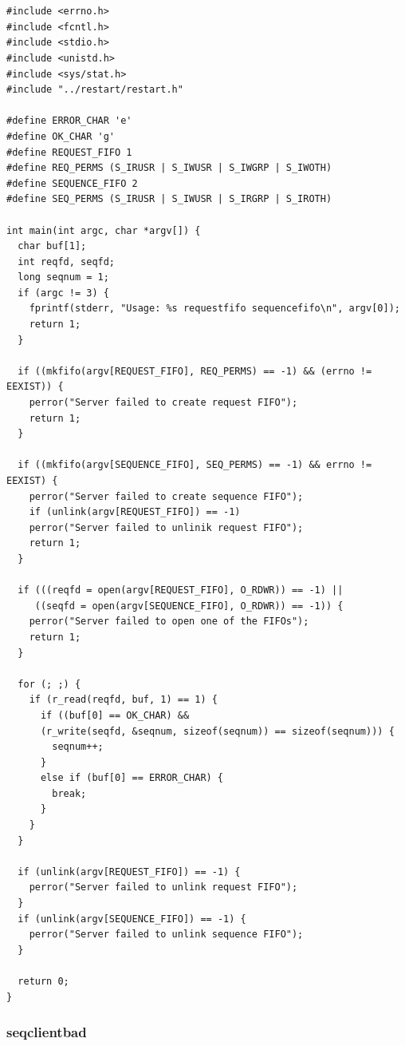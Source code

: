 \documentclass[letter,12pt,sffamily]{article}
\begin{document}
\begin{verbatim}
	

#include <errno.h>
#include <fcntl.h>
#include <stdio.h>
#include <unistd.h>
#include <sys/stat.h>
#include "../restart/restart.h"

#define ERROR_CHAR 'e'
#define OK_CHAR 'g'
#define REQUEST_FIFO 1
#define REQ_PERMS (S_IRUSR | S_IWUSR | S_IWGRP | S_IWOTH)
#define SEQUENCE_FIFO 2
#define SEQ_PERMS (S_IRUSR | S_IWUSR | S_IRGRP | S_IROTH)

int main(int argc, char *argv[]) {
  char buf[1];
  int reqfd, seqfd;
  long seqnum = 1;
  if (argc != 3) {
    fprintf(stderr, "Usage: %s requestfifo sequencefifo\n", argv[0]);
    return 1;
  }
	
  if ((mkfifo(argv[REQUEST_FIFO], REQ_PERMS) == -1) && (errno != EEXIST)) {
    perror("Server failed to create request FIFO");
    return 1;
  }
	
  if ((mkfifo(argv[SEQUENCE_FIFO], SEQ_PERMS) == -1) && errno != EEXIST) {
    perror("Server failed to create sequence FIFO");
    if (unlink(argv[REQUEST_FIFO]) == -1)
    perror("Server failed to unlinik request FIFO");
    return 1;
  }
	
  if (((reqfd = open(argv[REQUEST_FIFO], O_RDWR)) == -1) ||
     ((seqfd = open(argv[SEQUENCE_FIFO], O_RDWR)) == -1)) {
    perror("Server failed to open one of the FIFOs");
    return 1;
  }
	
  for (; ;) {
    if (r_read(reqfd, buf, 1) == 1) {
      if ((buf[0] == OK_CHAR) &&
      (r_write(seqfd, &seqnum, sizeof(seqnum)) == sizeof(seqnum))) {
        seqnum++;
      }
      else if (buf[0] == ERROR_CHAR) {
        break;
      }
    }
  }
	
  if (unlink(argv[REQUEST_FIFO]) == -1) {
    perror("Server failed to unlink request FIFO");
  }
  if (unlink(argv[SEQUENCE_FIFO]) == -1) {
    perror("Server failed to unlink sequence FIFO");
  }
	
  return 0;
}
\end{verbatim}
\subsubsection{seqclientbad}
\renewcommand{\theFancyVerbLine}{
	\sffamily\textcolor[rgb]{0.5,0.5,0.5}{\scriptsize\arabic{FancyVerbLine}}}
\end{document}
